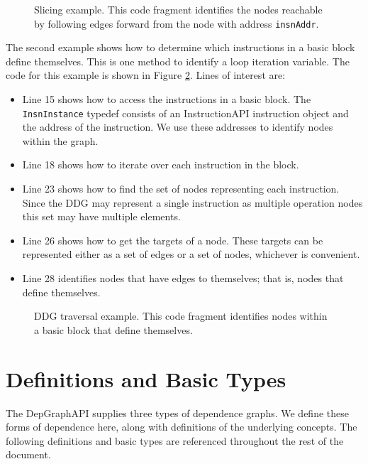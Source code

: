 \documentclass[12pt,titlepage]{article}
\begin{document}
\begin{figure}\label{example1}

\caption{Slicing example. This code fragment identifies the nodes
  reachable by following edges forward from the node with address
  \texttt{insnAddr}.}
\end{figure}


The second example shows how to determine which instructions in a
basic block define themselves. This is one method to identify a loop
iteration variable. The code for this example is shown in Figure
\ref{example2}. Lines of interest are:
\begin{itemize}
\item Line 15 shows how to access the instructions in a basic
  block. The \texttt{InsnInstance} typedef consists of an
  InstructionAPI instruction object and the address of the
  instruction. We use these addresses to identify nodes within the
  graph.
\item Line 18 shows how to iterate over each instruction in the block.
\item Line 23 shows how to find the set of nodes representing each
  instruction. Since the DDG may represent a single instruction as
  multiple operation nodes this set may have multiple elements. 
\item Line 26 shows how to get the targets of a node. These targets
  can be represented either as a set of edges or a set of nodes,
  whichever is convenient. 
\item Line 28 identifies nodes that have edges to themselves; that is,
  nodes that define themselves. 
\end{itemize}

\begin{figure}\label{example2}

\caption{DDG traversal example. This code fragment identifies nodes
  within a basic block that define themselves.}
\end{figure}


\section{Definitions and Basic Types}

The DepGraphAPI supplies three types of dependence graphs. We define
these forms of dependence here, along with definitions of the
underlying concepts. The following definitions and basic types are
referenced throughout the rest of the document.
\end{document}
